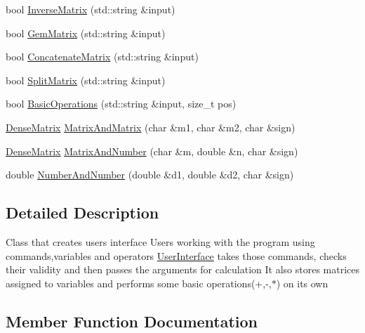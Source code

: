 \begin{DoxyCompactItemize}
bool \mbox{\hyperlink{class_user_interface_a4401c31d4d576435c580f9d92b5e2c85}{Inverse\+Matrix}} (std\+::string \&input)
\item 
bool \mbox{\hyperlink{class_user_interface_ac9e54720a9056bb619910ea83743c63d}{Gem\+Matrix}} (std\+::string \&input)
\item 
bool \mbox{\hyperlink{class_user_interface_af7f6c880f4be7faef6a97cd568703f40}{Concatenate\+Matrix}} (std\+::string \&input)
\item 
bool \mbox{\hyperlink{class_user_interface_a61b646c8242529a3bff85242aa1f2d2b}{Split\+Matrix}} (std\+::string \&input)
\item 
bool \mbox{\hyperlink{class_user_interface_a0c002675ff974a25b23466629397b08a}{Basic\+Operations}} (std\+::string \&input, size\+\_\+t pos)
\item 
\mbox{\hyperlink{class_dense_matrix}{Dense\+Matrix}} \mbox{\hyperlink{class_user_interface_a7b28a49562754ca62e4c06d4398e1c7a}{Matrix\+And\+Matrix}} (char \&m1, char \&m2, char \&sign)
\item 
\mbox{\hyperlink{class_dense_matrix}{Dense\+Matrix}} \mbox{\hyperlink{class_user_interface_a1d020a654356d50763bd4437ce632223}{Matrix\+And\+Number}} (char \&m, double \&n, char \&sign)
\item 
double \mbox{\hyperlink{class_user_interface_aee627f438b090059ad3c8af6b7cdd3fa}{Number\+And\+Number}} (double \&d1, double \&d2, char \&sign)
\end{DoxyCompactItemize}


\subsection{Detailed Description}
Class that creates users interface Users working with the program using commands,variables and operators \mbox{\hyperlink{class_user_interface}{User\+Interface}} takes those commands, checks their validity and then passes the arguments for calculation It also stores matrices assigned to variables and performs some basic operations(+,-\/,$\ast$) on its own 

\subsection{Member Function Documentation}
\mbox{\label{class_user_interface_a0c002675ff974a25b23466629397b08a}} 
